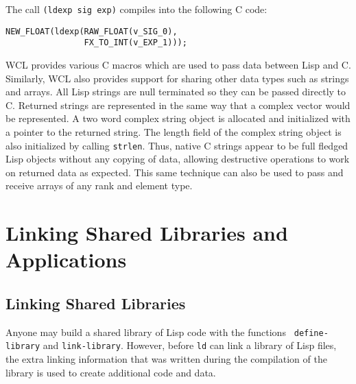 The call {\tt (ldexp sig exp)} compiles into the following C code:

\begin{verbatim}
NEW_FLOAT(ldexp(RAW_FLOAT(v_SIG_0), 
                FX_TO_INT(v_EXP_1)));
\end{verbatim}

WCL provides various C macros which are used to pass data between Lisp
and C.  Similarly, WCL also provides support for sharing other data
types such as strings and arrays.  All Lisp strings are null
terminated so they can be passed directly to C.  Returned strings are
represented in the same way that a complex vector would be
represented. A two word complex string object is allocated and
initialized with a pointer to the returned string. The length field of
the complex string object is also initialized by calling {\tt strlen}.
Thus, native C strings appear to be full fledged Lisp objects without
any copying of data, allowing destructive operations to work on
returned data as expected. This same technique can also be used to pass and
receive arrays of any rank and element type.

\section{Linking Shared Libraries and Applications}

\subsection{Linking Shared Libraries}

Anyone may build a shared library of Lisp code with the functions {\tt
define-library} and {\tt link-library}.  However, before {\tt ld} can
link a library of Lisp files, the extra linking information that was
written during the compilation of the library is used to create
additional code and data.


